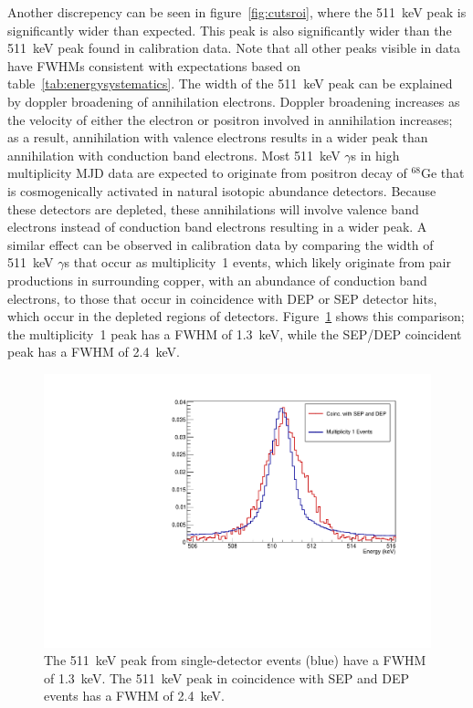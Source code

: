 \documentclass[notitlepage,rmp,aps,10pt]{revtex4-1}
\begin{document}
Another discrepency can be seen in figure~\ref{fig:cutsroi}, where the 511~keV peak is significantly wider than expected.
This peak is also significantly wider than the 511~keV peak found in calibration data.
Note that all other peaks visible in data have FWHMs consistent with expectations based on table~\ref{tab:energysystematics}.
The width of the 511~keV peak can be explained by doppler broadening of annihilation electrons.
Doppler broadening increases as the velocity of either the electron or positron involved in annihilation increases; as a result, annihilation with valence electrons results in a wider peak than annihilation with conduction band electrons.
Most 511~keV $\gamma$s in high multiplicity MJD data are expected to originate from positron decay of $^{68}$Ge that is cosmogenically activated in natural isotopic abundance detectors.
Because these detectors are depleted, these annihilations will involve valence band electrons instead of conduction band electrons resulting in a wider peak.
A similar effect can be observed in calibration data by comparing the width of 511~keV $\gamma$s that occur as multiplicity~1 events, which likely originate from pair productions in surrounding copper, with an abundance of conduction band electrons, to those that occur in coincidence with DEP or SEP detector hits, which occur in the depleted regions of detectors.
Figure~\ref{fig:511peakwidths} shows this comparison; the multiplicity~1 peak has a FWHM of 1.3~keV, while the SEP/DEP coincident peak has a FWHM of 2.4~keV.
\begin{figure}[h]
  \centering
  \includegraphics[width=.8\linewidth]{511peaks}
  \caption[Measured events after all cuts with ROIs drawn]{\label{fig:511peakwidths}
    The 511~keV peak from single-detector events (blue) have a FWHM of 1.3~keV. The 511~keV peak in coincidence with SEP and DEP events has a FWHM of 2.4~keV.
  }
\end{figure}
\end{document}
